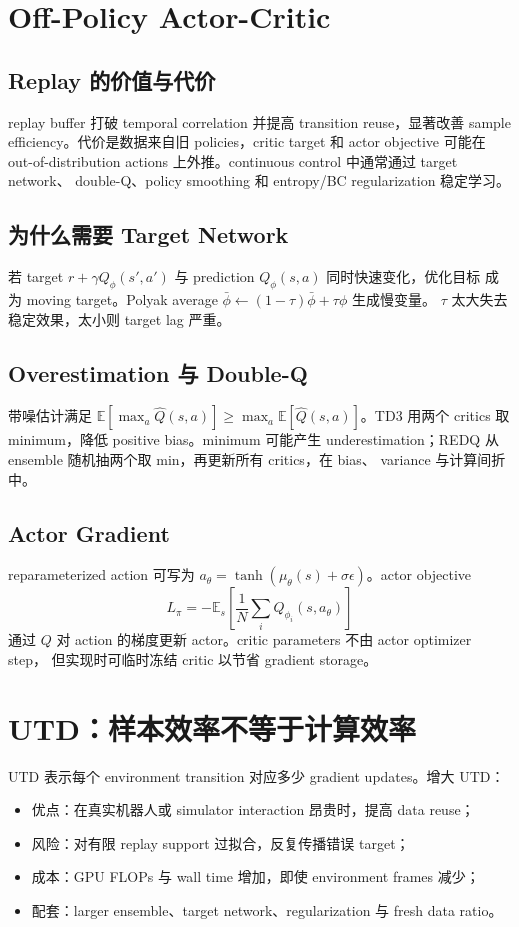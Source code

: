 \documentclass[10pt,twocolumn,a4paper]{ctexart}
\begin{document}
\section{Off-Policy Actor-Critic}
\subsection{Replay 的价值与代价}
replay buffer 打破 temporal correlation 并提高 transition reuse，显著改善 sample
efficiency。代价是数据来自旧 policies，critic target 和 actor objective 可能在
out-of-distribution actions 上外推。continuous control 中通常通过 target network、
double-Q、policy smoothing 和 entropy/BC regularization 稳定学习。

\subsection{为什么需要 Target Network}
若 target $r+\gamma Q_\phi(s',a')$ 与 prediction $Q_\phi(s,a)$ 同时快速变化，优化目标
成为 moving target。Polyak average
$\bar\phi\leftarrow(1-\tau)\bar\phi+\tau\phi$ 生成慢变量。
$\tau$ 太大失去稳定效果，太小则 target lag 严重。

\subsection{Overestimation 与 Double-Q}
带噪估计满足
$\mathbb E[\max_a\hat Q(s,a)]\ge\max_a\mathbb E[\hat Q(s,a)]$。TD3 用两个 critics
取 minimum，降低 positive bias\citep{fujimoto2018td3}。minimum 可能产生
underestimation；REDQ 从 ensemble 随机抽两个取 min，再更新所有 critics，在 bias、
variance 与计算间折中\citep{chen2021redq}。

\subsection{Actor Gradient}
reparameterized action 可写为
$a_\theta=\tanh(\mu_\theta(s)+\sigma\epsilon)$。actor objective
\[
L_\pi=-\mathbb E_s\left[\frac1N\sum_iQ_{\phi_i}(s,a_\theta)\right]
\]
通过 $Q$ 对 action 的梯度更新 actor。critic parameters 不由 actor optimizer step，
但实现时可临时冻结 critic 以节省 gradient storage。

\section{UTD：样本效率不等于计算效率}
UTD 表示每个 environment transition 对应多少 gradient updates。增大 UTD：
\begin{itemize}
  \item 优点：在真实机器人或 simulator interaction 昂贵时，提高 data reuse；
  \item 风险：对有限 replay support 过拟合，反复传播错误 target；
  \item 成本：GPU FLOPs 与 wall time 增加，即使 environment frames 减少；
  \item 配套：larger ensemble、target network、regularization 与 fresh data ratio。
\end{itemize}
\end{document}
